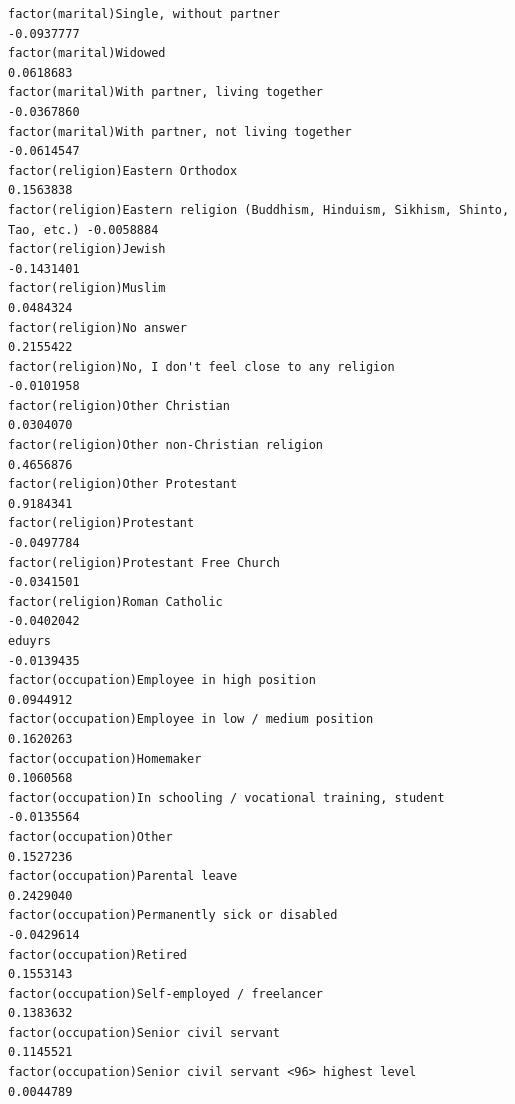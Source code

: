 \documentclass[
]{article}
\begin{document}
\begin{table}
\begin{minipage}[t]{\linewidth}
{\begin{verbatim}
factor(marital)Single, without partner                                            -0.0937777
factor(marital)Widowed                                                             0.0618683
factor(marital)With partner, living together                                      -0.0367860
factor(marital)With partner, not living together                                  -0.0614547
factor(religion)Eastern Orthodox                                                   0.1563838
factor(religion)Eastern religion (Buddhism, Hinduism, Sikhism, Shinto, Tao, etc.) -0.0058884
factor(religion)Jewish                                                            -0.1431401
factor(religion)Muslim                                                             0.0484324
factor(religion)No answer                                                          0.2155422
factor(religion)No, I don't feel close to any religion                            -0.0101958
factor(religion)Other Christian                                                    0.0304070
factor(religion)Other non-Christian religion                                       0.4656876
factor(religion)Other Protestant                                                   0.9184341
factor(religion)Protestant                                                        -0.0497784
factor(religion)Protestant Free Church                                            -0.0341501
factor(religion)Roman Catholic                                                    -0.0402042
eduyrs                                                                            -0.0139435
factor(occupation)Employee in high position                                        0.0944912
factor(occupation)Employee in low / medium position                                0.1620263
factor(occupation)Homemaker                                                        0.1060568
factor(occupation)In schooling / vocational training, student                     -0.0135564
factor(occupation)Other                                                            0.1527236
factor(occupation)Parental leave                                                   0.2429040
factor(occupation)Permanently sick or disabled                                    -0.0429614
factor(occupation)Retired                                                          0.1553143
factor(occupation)Self-employed / freelancer                                       0.1383632
factor(occupation)Senior civil servant                                             0.1145521
factor(occupation)Senior civil servant <96> highest level                          0.0044789

\end{verbatim}}
\end{minipage}
\end{table}
\end{document}
